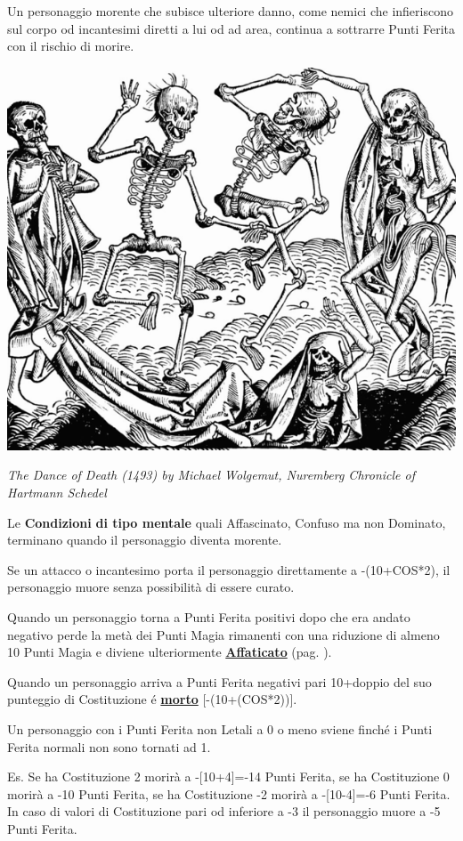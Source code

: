 \begin{multicols}{2}
Un personaggio morente che subisce ulteriore danno, come nemici che infieriscono sul corpo od incantesimi diretti a lui od ad area, continua a sottrarre Punti Ferita con il rischio di morire.

\begin{center}
\includegraphics[width=0.8\linewidth]{immagini/Nuremberg_chronicles.png}

\emph{The Dance of Death (1493) by Michael Wolgemut, Nuremberg Chronicle of Hartmann Schedel}
\end{center}

\medskip

Le \textbf{Condizioni} \textbf{di tipo mentale} quali Affascinato, Confuso ma non Dominato, terminano quando il personaggio diventa morente.

Se un attacco o incantesimo porta il personaggio direttamente a -(10+COS*2), il personaggio muore senza possibilità di essere curato.

Quando un personaggio torna a Punti Ferita positivi dopo che era andato negativo perde la metà dei Punti Magia rimanenti con una riduzione di almeno 10 Punti Magia e diviene ulteriormente \hyperlink{affaticato}{\textbf{Affaticato}} (pag. \pageref{affaticato}).

Quando un personaggio arriva a Punti Ferita negativi pari 10+doppio del suo punteggio di Costituzione é \hyperlink{morto}{\textbf{morto}} [-(10+(COS*2))].

Un personaggio con i Punti Ferita non Letali a 0 o meno sviene finché i Punti Ferita normali non sono tornati ad 1.

Es. Se ha Costituzione 2 morirà a -[10+4]=-14 Punti Ferita, se ha Costituzione 0 morirà a -10 Punti Ferita, se ha Costituzione -2 morirà a -[10-4]=-6 Punti Ferita. In caso di valori di Costituzione pari od inferiore a -3 il personaggio muore a -5 Punti Ferita.


\end{multicols}

